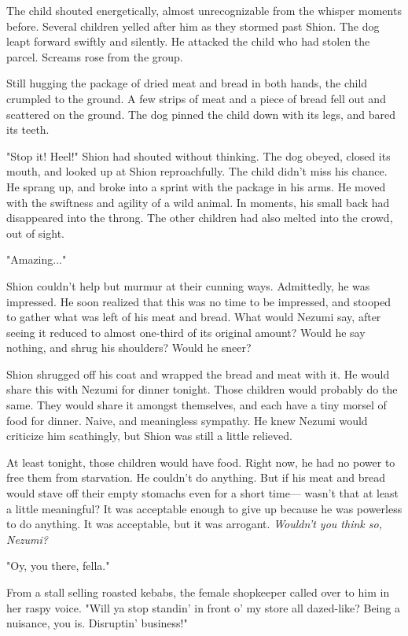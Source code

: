 The child shouted energetically, almost unrecognizable from the whisper
moments before. Several children yelled after him as they stormed past
Shion. The dog leapt forward swiftly and silently. He attacked the child
who had stolen the parcel. Screams rose from the group.

Still hugging the package of dried meat and bread in both hands, the
child crumpled to the ground. A few strips of meat and a piece of bread
fell out and scattered on the ground. The dog pinned the child down with
its legs, and bared its teeth.

"Stop it! Heel!" Shion had shouted without thinking. The dog obeyed,
closed its mouth, and looked up at Shion reproachfully. The child didn't
miss his chance. He sprang up, and broke into a sprint with the package
in his arms. He moved with the swiftness and agility of a wild animal.
In moments, his small back had disappeared into the throng. The other
children had also melted into the crowd, out of sight.

"Amazing..."

Shion couldn't help but murmur at their cunning ways. Admittedly, he was
impressed. He soon realized that this was no time to be impressed, and
stooped to gather what was left of his meat and bread. What would Nezumi
say, after seeing it reduced to almost one-third of its original amount?
Would he say nothing, and shrug his shoulders? Would he sneer?

Shion shrugged off his coat and wrapped the bread and meat with it. He
would share this with Nezumi for dinner tonight. Those children would
probably do the same. They would share it amongst themselves, and each
have a tiny morsel of food for dinner. Naive, and meaningless sympathy.
He knew Nezumi would criticize him scathingly, but Shion was still a
little relieved.

At least tonight, those children would have food. Right now, he had no
power to free them from starvation. He couldn't do anything. But if his
meat and bread would stave off their empty stomachs even for a short
time--- wasn't that at least a little meaningful? It was acceptable enough
to give up because he was powerless to do anything. It was acceptable,
but it was arrogant. \emph{Wouldn't you think so, Nezumi?}

"Oy, you there, fella."

From a stall selling roasted kebabs, the female shopkeeper called over
to him in her raspy voice. "Will ya stop standin' in front o' my store
all dazed-like? Being a nuisance, you is. Disruptin' business!"

